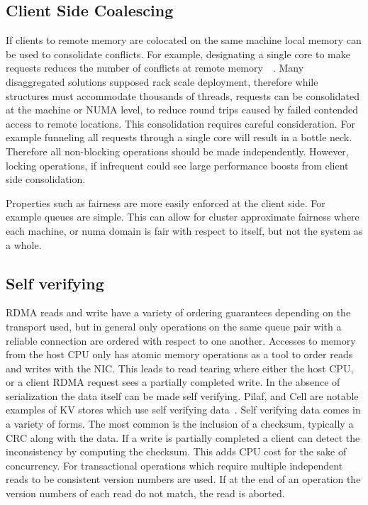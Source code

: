 \subsection{Client Side Coalescing}
If clients to remote memory are colocated on the same machine local memory can
be used to consolidate conflicts. For example, designating a single core to make
requests reduces the number of conflicts at remote
memory~\cite{flat-combine}~\cite{sherman}. Many disaggregated solutions supposed
rack scale deployment, therefore while structures must accommodate thousands of
threads, requests can be consolidated at the machine or NUMA level, to reduce
round trips caused by failed contended access to remote locations. This
consolidation requires careful consideration. For example funneling all requests
through a single core will result in a bottle neck. Therefore all non-blocking
operations should be made independently. However, locking operations, if
infrequent could see large performance boosts from client side consolidation.

Properties such as fairness are more easily enforced at the client side. For
example queues are simple. This can allow for cluster approximate fairness where
each machine, or numa domain is fair with respect to itself, but not the system
as a whole.

\subsection{Self verifying} RDMA reads and write have a variety of ordering
guarantees depending on the transport used, but in general only operations on
the same queue pair with a reliable connection are ordered with respect to one
another. Accesses to memory from the host CPU only has atomic memory operations
as a tool to order reads and writes with the NIC. This leads to read tearing
where either the host CPU, or a client RDMA request sees a partially completed
write. In the absence of serialization the data itself can be made self
verifying.  Pilaf, and Cell are notable examples of KV stores which use self
verifying data~\cite{pilaf,cell}. Self verifying data comes in a variety of
forms. The most common is the inclusion of a checksum, typically a CRC along
with the data. If a write is partially completed a client can detect the
inconsistency by computing the checksum. This adds CPU cost for the sake of
concurrency. For transactional operations which require multiple independent reads
to be consistent version numbers are used. If at the end of an operation the
version numbers of each read do not match, the read is aborted.


